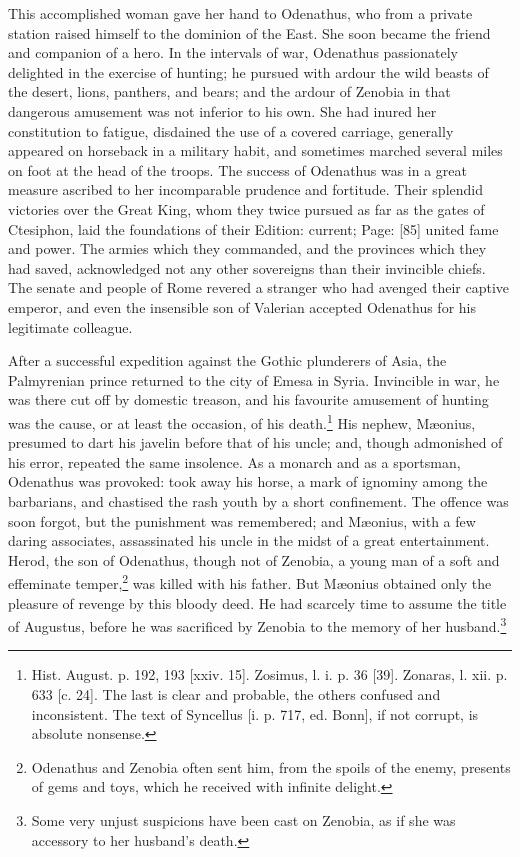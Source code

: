 This accomplished woman gave her hand to Odenathus, who from a private station raised himself to the dominion of the East. She soon became the friend and companion of a hero. In the intervals of war, Odenathus passionately delighted in the exercise of hunting; he pursued with ardour the wild beasts of the desert, lions, panthers, and bears; and the ardour of Zenobia in that dangerous amusement was not inferior to his own. She had inured her constitution to fatigue, disdained the use of a covered carriage, generally appeared on horseback in a military habit, and sometimes marched several miles on foot at the head of the troops. The success of Odenathus was in a great measure ascribed to her incomparable prudence and fortitude. Their splendid victories over the Great King, whom they twice pursued as far as the gates of Ctesiphon, laid the foundations of their Edition: current; Page: [85] united fame and power. The armies which they commanded, and the provinces which they had saved, acknowledged not any other sovereigns than their invincible chiefs. The senate and people of Rome revered a stranger who had avenged their captive emperor, and even the insensible son of Valerian accepted Odenathus for his legitimate colleague.

After a successful expedition against the Gothic plunderers of Asia, the Palmyrenian prince returned to the city of Emesa in Syria. Invincible in war, he was there cut off by domestic treason, and his favourite amusement of hunting was the cause, or at least the occasion, of his death.\footnote{Hist. August. p. 192, 193 [xxiv. 15]. Zosimus, l. i. p. 36 [39]. Zonaras, l. xii. p. 633 [c. 24]. The last is clear and probable, the others confused and inconsistent. The text of Syncellus [i. p. 717, ed. Bonn], if not corrupt, is absolute nonsense.} His nephew, Mæonius, presumed to dart his javelin before that of his uncle; and, though admonished of his error, repeated the same insolence. As a monarch and as a sportsman, Odenathus was provoked: took away his horse, a mark of ignominy among the barbarians, and chastised the rash youth by a short confinement. The offence was soon forgot, but the punishment was remembered; and Mæonius, with a few daring associates, assassinated his uncle in the midst of a great entertainment. Herod, the son of Odenathus, though not of Zenobia, a young man of a soft and effeminate temper,\footnote{Odenathus and Zenobia often sent him, from the spoils of the enemy, presents of gems and toys, which he received with infinite delight.} was killed with his father. But Mæonius obtained only the pleasure of revenge by this bloody deed. He had scarcely time to assume the title of Augustus, before he was sacrificed by Zenobia to the memory of her husband.\footnote{Some very unjust suspicions have been cast on Zenobia, as if she was accessory to her husband\texthebrew{}’s death.}


